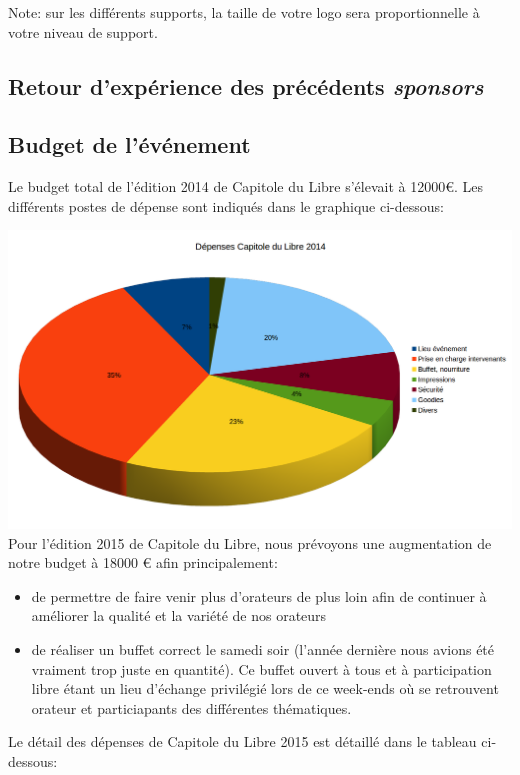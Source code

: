 Note: sur les différents supports, la taille de votre logo sera proportionnelle à votre niveau de support.

	\subsection{Retour d’expérience des précédents \textit{sponsors}}
	\subsection{Budget de l’événement}

Le budget total de l'édition 2014 de Capitole du Libre s'élevait à 12000€. Les différents postes de dépense sont indiqués dans le graphique ci-dessous:

\includegraphics[scale=0.6]{Images/budget_2014.png}\\

Pour l'édition 2015 de Capitole du Libre, nous prévoyons une augmentation de notre budget à 18000 € afin principalement:
\begin{itemize}[label=$\bullet$]
\item de permettre de faire venir plus d'orateurs de plus loin afin de continuer à améliorer la qualité et la variété de nos orateurs
\item de réaliser un buffet correct le samedi soir (l'année dernière nous avions été vraiment trop juste en quantité). Ce buffet ouvert à tous et à participation libre étant un lieu d'échange privilégié lors de ce week-ends où se retrouvent orateur et particiapants des différentes thématiques.
\end{itemize}

\Separateur

Le détail des dépenses de Capitole du Libre 2015 est détaillé dans le tableau ci-dessous:

